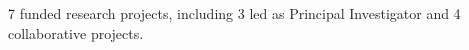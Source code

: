 

\newcommand*{\fundingcategorystyle}[1]{{\fontsize{10pt}{0.9em}\bodyfont\upshape\color{graytext} #1}}

\newcommand*{\fundingentry}[5]{%
  \vspace{-2.0mm}%
  \setlength\tabcolsep{0pt}%
  \begin{tabular*}{\textwidth}{@{\extracolsep{\fill}} L{\textwidth - 4.5cm} R{4.5cm}}
    \begin{minipage}[t]{\linewidth}
      \raggedright
      \entrytitlestyle{#1}\par
      \vspace{1pt}%
      \fundingcategorystyle{#3}%
    \end{minipage}
    &
    \begin{minipage}[t]{\linewidth}\raggedleft
      \entrylocationstyle{#2}\par
      \entrydatestyle{#4}%
    \end{minipage}\\
    \multicolumn{2}{L{\textwidth}}{\vspace{1mm}\descriptionstyle{#5}}
  \end{tabular*}%
}

\begin{cvparagraph}
{\color{black}7 funded research projects, including 3 led as Principal Investigator and 4 collaborative projects.}
\end{cvparagraph}

